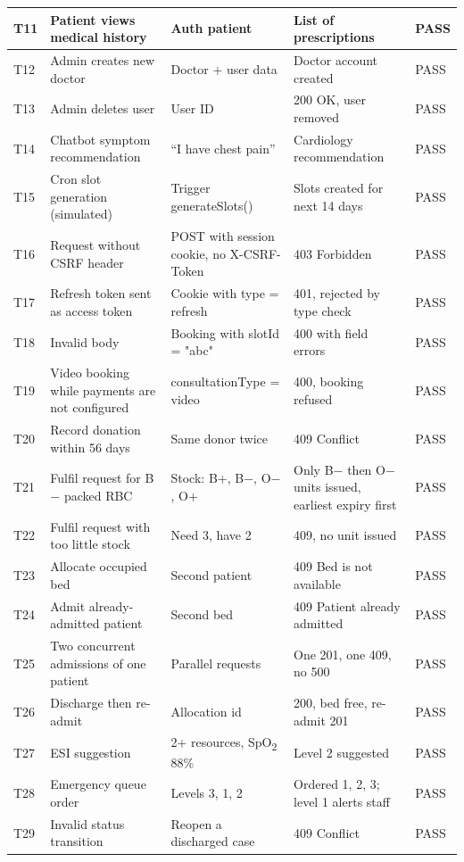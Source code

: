 \begin{longtable}{|C{0.8cm}|L{3.9cm}|L{3.4cm}|L{3.5cm}|C{1.2cm}|}
\hline
T11 & Patient views medical history & Auth patient & List of prescriptions & PASS \\
\hline
T12 & Admin creates new doctor & Doctor + user data & Doctor account created & PASS \\
\hline
T13 & Admin deletes user & User ID & 200 OK, user removed & PASS \\
\hline
T14 & Chatbot symptom recommendation & ``I have chest pain'' & Cardiology recommendation & PASS \\
\hline
T15 & Cron slot generation (simulated) & Trigger generateSlots() & Slots created for next 14 days & PASS \\
\hline
T16 & Request without CSRF header & POST with session cookie, no X-CSRF-Token & 403 Forbidden & PASS \\
\hline
T17 & Refresh token sent as access token & Cookie with type = refresh & 401, rejected by type check & PASS \\
\hline
T18 & Invalid body & Booking with slotId = "abc" & 400 with field errors & PASS \\
\hline
T19 & Video booking while payments are not configured & consultationType = video & 400, booking refused & PASS \\
\hline
T20 & Record donation within 56 days & Same donor twice & 409 Conflict & PASS \\
\hline
T21 & Fulfil request for B$-$ packed RBC & Stock: B+, B$-$, O$-$, O+ & Only B$-$ then O$-$ units issued, earliest expiry first & PASS \\
\hline
T22 & Fulfil request with too little stock & Need 3, have 2 & 409, no unit issued & PASS \\
\hline
T23 & Allocate occupied bed & Second patient & 409 Bed is not available & PASS \\
\hline
T24 & Admit already-admitted patient & Second bed & 409 Patient already admitted & PASS \\
\hline
T25 & Two concurrent admissions of one patient & Parallel requests & One 201, one 409, no 500 & PASS \\
\hline
T26 & Discharge then re-admit & Allocation id & 200, bed free, re-admit 201 & PASS \\
\hline
T27 & ESI suggestion & 2+ resources, SpO\textsubscript{2} 88\% & Level 2 suggested & PASS \\
\hline
T28 & Emergency queue order & Levels 3, 1, 2 & Ordered 1, 2, 3; level 1 alerts staff & PASS \\
\hline
T29 & Invalid status transition & Reopen a discharged case & 409 Conflict & PASS \\

\end{longtable}
